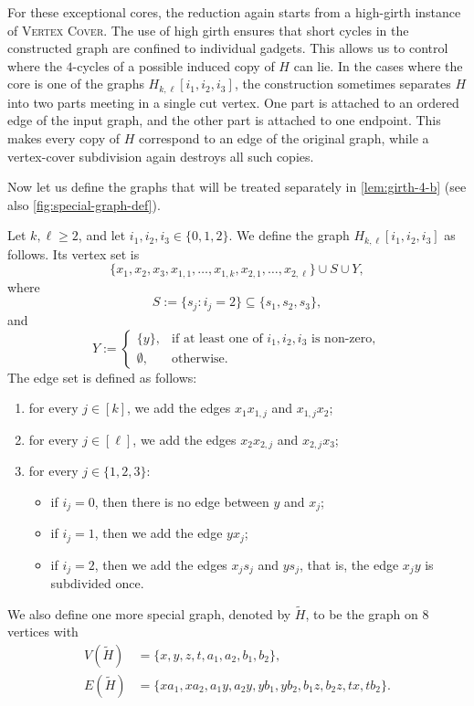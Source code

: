 \documentclass[a4paper,UKenglish,cleveref, autoref, thm-restate]{lipics-v2021}
\begin{document}
For these exceptional cores, the reduction again starts from a high-girth instance of \textsc{Vertex Cover}.
The use of high girth ensures that short cycles in the constructed graph are confined to individual gadgets.
This allows us to control where the $4$-cycles of a possible induced copy of $H$ can lie.
In the cases where the core is one of the graphs
$H_{k,\ell}[i_1,i_2,i_3]$, the construction sometimes separates $H$ into two parts meeting in a single cut vertex.
One part is attached to an ordered edge of the input graph, and the other part is attached to one endpoint.
This makes every copy of $H$ correspond to an edge of the original graph, while a vertex-cover subdivision again destroys all such copies.


Now let us define the graphs that will be treated separately in \cref{lem:girth-4-b} (see also \cref{fig:special-graph-def}).

Let $k,\ell\geq 2$, and let $i_1,i_2,i_3\in \{0,1,2\}$.
We define the graph $H_{k,\ell}[i_1,i_2,i_3]$ as follows.
Its vertex set is
\[
\{x_1,x_2,x_3,x_{1,1},\ldots,x_{1,k},x_{2,1},\ldots,x_{2,\ell}\}\cup S\cup Y,
\]
where
\[
S:=\{s_j : i_j=2\}\subseteq \{s_1,s_2,s_3\},
\]
and
\[
Y:=
\begin{cases}
\{y\}, & \text{if at least one of } i_1,i_2,i_3 \text{ is non-zero},\\
\emptyset, & \text{otherwise.}
\end{cases}
\]
The edge set is defined as follows:
\begin{enumerate}[(1)]
    \item for every $j\in [k]$, we add the edges $x_1x_{1,j}$ and $x_{1,j}x_2$;
    \item for every $j\in [\ell]$, we add the edges $x_2x_{2,j}$ and $x_{2,j}x_3$;
    \item for every $j\in \{1,2,3\}$:
    \begin{itemize}
        \item if $i_j=0$, then there is no edge between $y$ and $x_j$;
        \item if $i_j=1$, then we add the edge $yx_j$;
        \item if $i_j=2$, then we add the edges $x_js_j$ and $ys_j$, that is, the edge $x_jy$ is subdivided once.
    \end{itemize}
\end{enumerate}

We also define one more special graph, denoted by $\widetilde{H}$, to be the graph on $8$ vertices with
\begin{align*}
    V(\widetilde{H})&=\{x,y,z,t,a_1,a_2,b_1,b_2\}, \\
    E(\widetilde{H})&=\{xa_1,xa_2,a_1y,a_2y,yb_1,yb_2,b_1z,b_2z,tx,tb_2\}.
\end{align*}
\end{document}
